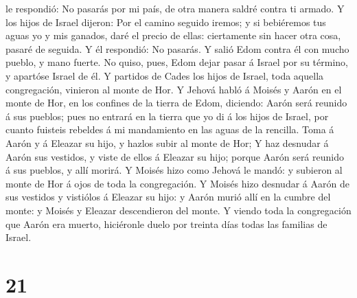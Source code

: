 le respondió: No pasarás por mi país, de otra manera saldré contra ti
armado.  Y los hijos de Israel dijeron: Por el camino
seguido iremos; y si bebiéremos tus aguas yo y mis ganados, daré el
precio de ellas: ciertamente sin hacer otra cosa, pasaré de seguida.
 Y él respondió: No pasarás. Y salió Edom contra él con
mucho pueblo, y mano fuerte.  No quiso, pues, Edom dejar
pasar á Israel por su término, y apartóse Israel de él. 
Y partidos de Cades los hijos de Israel, toda aquella congregación,
vinieron al monte de Hor.  Y Jehová habló á Moisés y
Aarón en el monte de Hor, en los confines de la tierra de Edom,
diciendo:  Aarón será reunido á sus pueblos; pues no
entrará en la tierra que yo di á los hijos de Israel, por cuanto
fuisteis rebeldes á mi mandamiento en las aguas de la rencilla.
 Toma á Aarón y á Eleazar su hijo, y hazlos subir al
monte de Hor;  Y haz desnudar á Aarón sus vestidos, y
viste de ellos á Eleazar su hijo; porque Aarón será reunido á sus
pueblos, y allí morirá.  Y Moisés hizo como Jehová le
mandó: y subieron al monte de Hor á ojos de toda la congregación.
 Y Moisés hizo desnudar á Aarón de sus vestidos y
vistiólos á Eleazar su hijo: y Aarón murió allí en la cumbre del monte:
y Moisés y Eleazar descendieron del monte.  Y viendo toda
la congregación que Aarón era muerto, hiciéronle duelo por treinta días
todas las familias de Israel.

\hypertarget{section-20}{%
\section{21}\label{section-20}}

